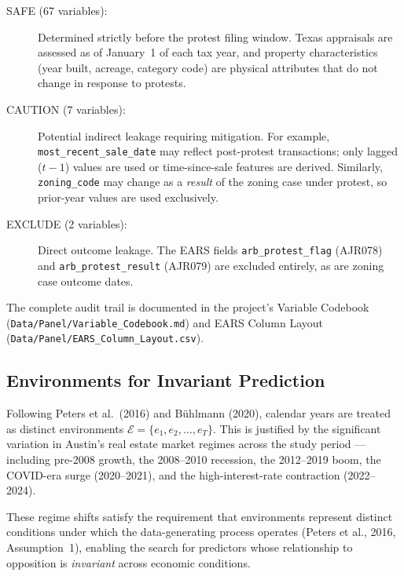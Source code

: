 \begin{description}
 \item[SAFE (67 variables):] Determined strictly before the protest filing window.
 Texas appraisals are assessed as of January~1 of each tax year,
 and property characteristics (year built, acreage, category code) are physical
 attributes that do not change in response to protests.

 \item[CAUTION (7 variables):] Potential indirect leakage requiring mitigation.
 For example, \texttt{most\_recent\_sale\_date} may reflect post-protest transactions;
 only lagged ($t-1$) values are used or time-since-sale features are derived.
 Similarly, \texttt{zoning\_code} may change as a \textit{result} of the zoning case
 under protest, so prior-year values are used exclusively.

 \item[EXCLUDE (2 variables):] Direct outcome leakage.
 The EARS fields \texttt{arb\_protest\_flag} (AJR078) and \texttt{arb\_protest\_result} (AJR079)
 are excluded entirely, as are zoning case outcome dates.
\end{description}

\noindent
The complete audit trail is documented in the project's Variable Codebook
(\texttt{Data/Panel/Variable\_Codebook.md}) and EARS Column Layout
(\texttt{Data/Panel/EARS\_Column\_Layout.csv}).

\subsection{Environments for Invariant Prediction}

Following Peters et al.\ (2016) and Bühlmann (2020), calendar years are treated as
distinct environments $\mathcal{E} = \{e_1, e_2, \ldots, e_T\}$.
This is justified by the significant variation in Austin's real estate market regimes
across the study period --- including pre-2008 growth, the 2008--2010 recession,
the 2012--2019 boom, the COVID-era surge (2020--2021),
and the high-interest-rate contraction (2022--2024).

These regime shifts satisfy the requirement that environments represent
distinct conditions under which the data-generating process operates
(Peters et al., 2016, Assumption~1),
enabling the search for predictors whose relationship to opposition
is \textit{invariant} across economic conditions.
